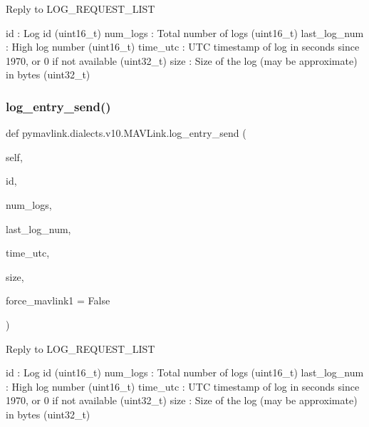 \begin{DoxyVerb}
\begin{DoxyVerb}
\begin{DoxyVerb}
\begin{DoxyVerb}
\begin{DoxyVerb}Reply to LOG_REQUEST_LIST

id                        : Log id (uint16_t)
num_logs                  : Total number of logs (uint16_t)
last_log_num              : High log number (uint16_t)
time_utc                  : UTC timestamp of log in seconds since 1970, or 0 if not available (uint32_t)
size                      : Size of the log (may be approximate) in bytes (uint32_t)\end{DoxyVerb}
 \mbox{\label{classpymavlink_1_1dialects_1_1v10_1_1MAVLink_a6e1a9cb48a6d29843d547769af26d2d9}} 
\subsubsection{\texorpdfstring{log\+\_\+entry\+\_\+send()}{log\_entry\_send()}}
{\footnotesize\ttfamily def pymavlink.\+dialects.\+v10.\+M\+A\+V\+Link.\+log\+\_\+entry\+\_\+send (\begin{DoxyParamCaption}\item[{}]{self,  }\item[{}]{id,  }\item[{}]{num\+\_\+logs,  }\item[{}]{last\+\_\+log\+\_\+num,  }\item[{}]{time\+\_\+utc,  }\item[{}]{size,  }\item[{}]{force\+\_\+mavlink1 = {\ttfamily False} }\end{DoxyParamCaption})}

\begin{DoxyVerb}Reply to LOG_REQUEST_LIST

id                        : Log id (uint16_t)
num_logs                  : Total number of logs (uint16_t)
last_log_num              : High log number (uint16_t)
time_utc                  : UTC timestamp of log in seconds since 1970, or 0 if not available (uint32_t)
size                      : Size of the log (may be approximate) in bytes (uint32_t)\end{DoxyVerb}
 \mbox{\label{classpymavlink_1_1dialects_1_1v10_1_1MAVLink_ad18343a2660ccd8e7c4ca8860cbc864a}} 

\end{DoxyVerb}
\end{DoxyVerb}
\end{DoxyVerb}
\end{DoxyVerb}
